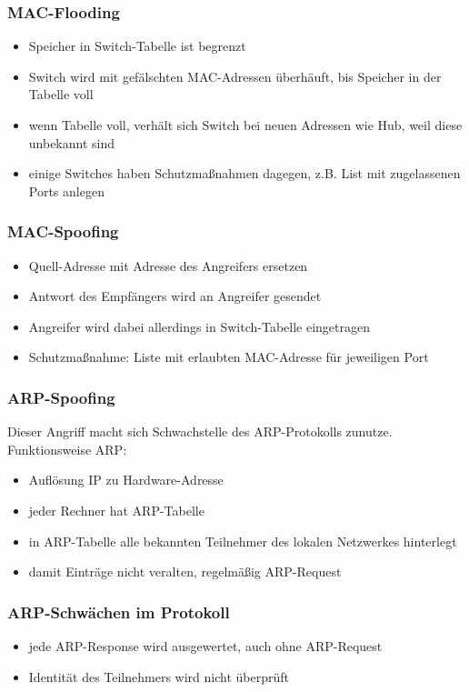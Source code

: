 \documentclass{beamer}
\begin{document}
        \begin{frame}
        	\frametitle{MAC-Flooding}
        	\begin{itemize}
	       	\item Speicher in Switch-Tabelle ist begrenzt
	       	\item Switch wird mit gefälschten MAC-Adressen überhäuft, bis Speicher in der Tabelle voll
	       	\item wenn Tabelle voll, verhält sich Switch bei neuen Adressen wie Hub, weil diese unbekannt sind
	       	\item einige Switches haben Schutzmaßnahmen dagegen, z.B. List mit zugelassenen Ports anlegen
	       	\end{itemize} 
                       	
    	\end{frame}
		\begin{frame}
        	\frametitle{MAC-Spoofing}
        	\begin{itemize}
        	\item Quell-Adresse mit Adresse des Angreifers ersetzen
        	\item Antwort des Empfängers wird an Angreifer gesendet
        	\item Angreifer wird dabei allerdings in Switch-Tabelle eingetragen
        	\item Schutzmaßnahme: Liste mit erlaubten MAC-Adresse für jeweiligen Port
        	\end{itemize}
                       	
    	\end{frame}
    	\begin{frame}
    		\frametitle{ARP-Spoofing}
    		Dieser Angriff macht sich Schwachstelle des ARP-Protokolls zunutze.\\
    		Funktionsweise ARP:
    		\begin{itemize}
    		\item Auflösung IP zu Hardware-Adresse
    		\item jeder Rechner hat ARP-Tabelle
    		\item in ARP-Tabelle alle bekannten Teilnehmer des lokalen Netzwerkes hinterlegt
    		\item damit Einträge nicht veralten, regelmäßig ARP-Request
    		\end{itemize}  	
    	\end{frame}
    	
    	\begin{frame}
    		\frametitle{ARP-Schwächen im Protokoll}
    		\begin{itemize}
    		\item jede ARP-Response wird ausgewertet, auch ohne ARP-Request
    		\item Identität des Teilnehmers wird nicht überprüft
    		\end{itemize}           	
    	\end{frame}
    	
\end{document}
